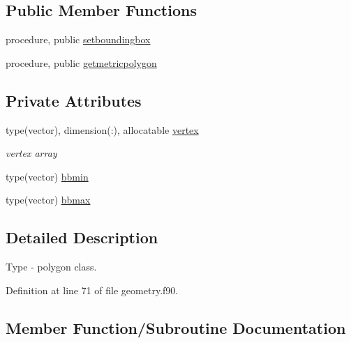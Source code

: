 \subsection*{Public Member Functions}
\begin{DoxyCompactItemize}
\item 
procedure, public \mbox{\hyperlink{structgeometry__mod_1_1polygon_a7d9ad70e834269c63b3e6339c65fe2c3}{setboundingbox}}
\item 
procedure, public \mbox{\hyperlink{structgeometry__mod_1_1polygon_acd3b99f250f50ce45cb4c54b6f24a079}{getmetricpolygon}}
\end{DoxyCompactItemize}
\subsection*{Private Attributes}
\begin{DoxyCompactItemize}
\item 
type(vector), dimension(\+:), allocatable \mbox{\hyperlink{structgeometry__mod_1_1polygon_a8842e1792a26fbc0a8ab2ad252d07998}{vertex}}
\begin{DoxyCompactList}\small\item\em vertex array \end{DoxyCompactList}\item 
type(vector) \mbox{\hyperlink{structgeometry__mod_1_1polygon_a962e69bdf4fc506d07445927f9f45776}{bbmin}}
\item 
type(vector) \mbox{\hyperlink{structgeometry__mod_1_1polygon_a466582ac4df0ff7e8e0fbd74a7778a88}{bbmax}}
\end{DoxyCompactItemize}


\subsection{Detailed Description}
Type -\/ polygon class. 

Definition at line 71 of file geometry.\+f90.



\subsection{Member Function/\+Subroutine Documentation}
\mbox{\label{structgeometry__mod_1_1polygon_acd3b99f250f50ce45cb4c54b6f24a079}} 

